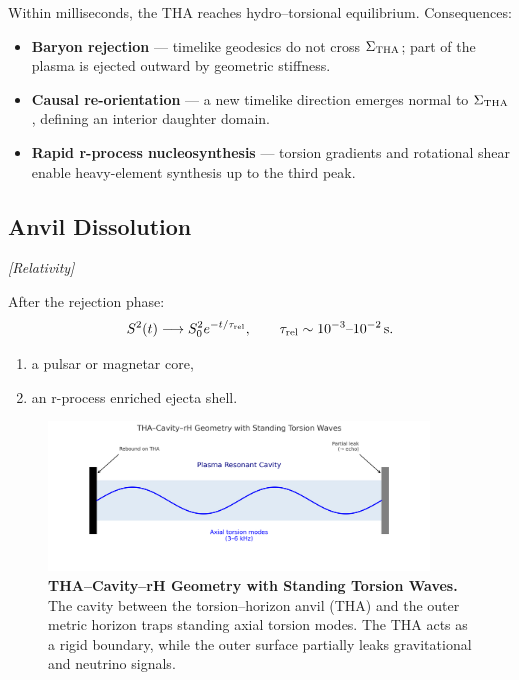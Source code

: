 \documentclass{article}
\newcommand{\grtag}{\textcolor{blue!40!black}{\textit{[Relativity]}}}
\begin{document}
Within milliseconds, the THA reaches hydro--torsional equilibrium. Consequences:

\begin{itemize}[leftmargin=*]
  \item \textbf{Baryon rejection} --- timelike geodesics do not cross $\Sigma_{\rm THA}$; part of the plasma is ejected outward by geometric stiffness.
  \item \textbf{Causal re-orientation} --- a new timelike direction emerges normal to $\Sigma_{\rm THA}$, defining an interior daughter domain.
  \item \textbf{Rapid r-process nucleosynthesis} --- torsion gradients and rotational shear enable heavy-element synthesis up to the third peak.
\end{itemize}

\subsection{Anvil Dissolution}
\label{subsec:THF-dissolution}
\grtag

    
After the rejection phase:
\begin{equation}
  S^{2}(t) \longrightarrow S_{0}^{2} e^{-t/\tau_{\rm rel}}, \qquad \tau_{\rm rel} \sim 10^{-3}\text{--}10^{-2}\,\mathrm{s}.
\end{equation}

\begin{enumerate}[label=(\alph*)]
  \item a pulsar or magnetar core,
  \item an r-process enriched ejecta shell.
\end{enumerate}

\begin{figure}[ht!]
\centering
\includegraphics[width=0.9\textwidth]{THF_cavity_geometry.png}
\caption{\textbf{THA–Cavity–rH Geometry with Standing Torsion Waves.}
The cavity between the torsion–horizon anvil (THA) and the outer metric horizon
traps standing axial torsion modes. The THA acts as a rigid boundary,
while the outer surface partially leaks gravitational and neutrino signals.}
\label{fig:THF-cavity}
\end{figure}
\end{document}
